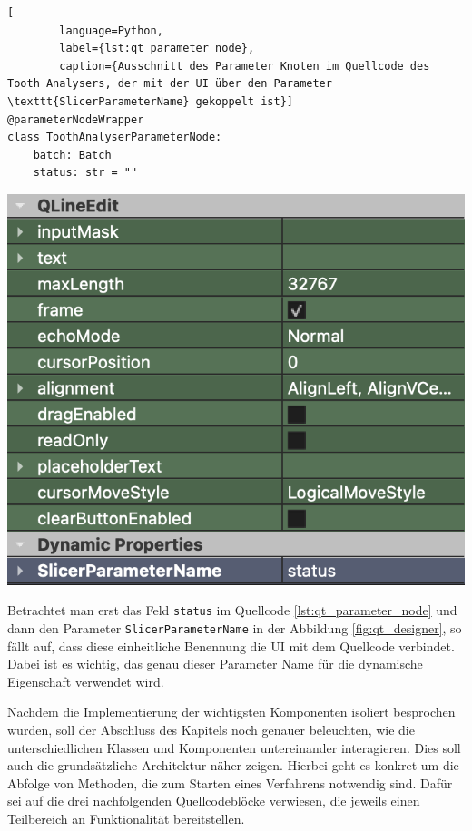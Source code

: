 \begin{minipage}{0.55\textwidth}
	\centering
	\begin{lstlisting}[
		language=Python,
		label={lst:qt_parameter_node},
		caption={Ausschnitt des Parameter Knoten im Quellcode des Tooth Analysers, der mit der UI über den Parameter \texttt{SlicerParameterName} gekoppelt ist}]
@parameterNodeWrapper
class ToothAnalyserParameterNode:
    batch: Batch
    status: str = ""
    \end{lstlisting}
\end{minipage}
\hfill
\begin{minipage}{0.35\textwidth}
	\centering
	\includegraphics[width=\textwidth]{img/qt_designer.png}
	 \label{fig:qt_designer}
\end{minipage}

Betrachtet man erst das Feld \texttt{status} im Quellcode \ref{lst:qt_parameter_node}
und dann den Parameter \texttt{SlicerParameterName} in der Abbildung
\ref{fig:qt_designer}, so fällt auf, dass diese einheitliche Benennung die \ac{UI}
mit dem Quellcode verbindet. Dabei ist es wichtig, das genau dieser Parameter Name
für die dynamische Eigenschaft verwendet wird.

Nachdem die Implementierung der wichtigsten Komponenten isoliert besprochen wurden,
soll der Abschluss des Kapitels noch genauer beleuchten, wie die unterschiedlichen
Klassen und Komponenten untereinander interagieren. Dies soll auch die
grundsätzliche Architektur näher zeigen. Hierbei geht es konkret um die Abfolge von
Methoden, die zum Starten eines Verfahrens notwendig sind. Dafür sei auf die drei
nachfolgenden Quellcodeblöcke verwiesen, die jeweils einen Teilbereich an
Funktionalität bereitstellen.

